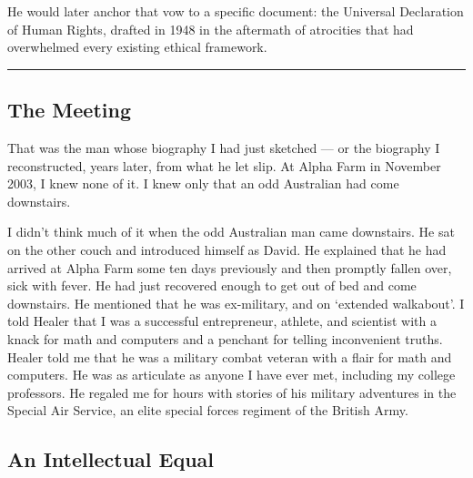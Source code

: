 He would later anchor that vow to a specific document: the Universal Declaration of Human Rights, drafted in 1948 in the aftermath of atrocities that had overwhelmed every existing ethical framework.

\vspace{1cm}\noindent\rule{0.5\textwidth}{0.5pt}\vspace{0.5cm}


\subsection*{The Meeting}
\label{pos03:the-meeting}


That was the man whose biography I had just sketched --- or the biography I reconstructed, years later, from what he let slip. At Alpha Farm in November 2003, I knew none of it. I knew only that an odd Australian had come downstairs.

I didn't think much of it when the odd Australian man came downstairs.  He sat on the other couch and introduced himself as David.  He explained that he had arrived at Alpha Farm some ten days previously and then promptly fallen over, sick with fever.  He had just recovered enough to get out of bed and come downstairs.  He mentioned that he was ex-military, and on `extended walkabout'.  I told Healer that I was a successful entrepreneur, athlete, and scientist with a knack for math and computers and a penchant for telling inconvenient truths.  Healer told me that he was a military combat veteran with a flair for math and computers.  He was as articulate as anyone I have ever met, including my college professors.  He regaled me for hours with stories of his military adventures in the Special Air Service, an elite special forces regiment of the British Army.

\subsection*{An Intellectual Equal}
\label{pos03:an-intellectual-equal}

